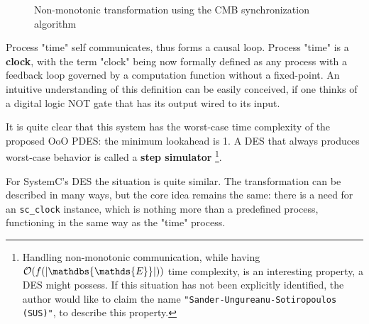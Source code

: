 \documentclass[11pt]{article}
\begin{document}
\begin{figure}[htpb]
\centering
{}
\caption{Non-monotonic transformation using the CMB synchronization algorithm} 
\label{fig:nonmon}
\end{figure}

Process "time" self communicates, thus forms a causal loop.
Process "time" is a \textbf{clock}, with the term "clock" being now formally defined as any process with a feedback loop governed by a computation function without a fixed-point.
An intuitive understanding of this definition can be easily conceived, if one thinks of a digital logic NOT gate that has its output wired to its input.

It is quite clear that this system has the worst-case time complexity of the proposed OoO PDES: the minimum lookahead is 1.
A DES that always produces worst-case behavior is called a \textbf{step simulator} \footnote{Handling non-monotonic communication, while having \(\mathcal{O}(f(|\mathdbs{\mathds{E}}|))\) time complexity, is an interesting property, a DES might possess.
If this situation has not been explicitly identified, the author would like to claim the name \texttt{"Sander-Ungureanu-Sotiropoulos (SUS)"}, to describe this property.}.

For SystemC's DES the situation is quite similar.
The transformation can be described in many ways, but the core idea remains the same:
there is a need for an \texttt{sc\_clock} instance, which is nothing more than a predefined process, functioning in the same way as the "time" process.





\clearpage
\end{document}
